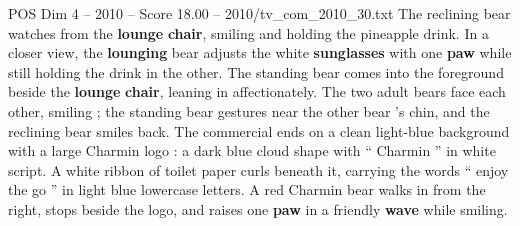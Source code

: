 \begin{textsample}{POS Dim 4 – 2010 – Score 18.00 – 2010/tv\_com\_2010\_30.txt}
The reclining bear watches from the \textbf{lounge} \textbf{chair}, smiling and holding the pineapple drink.
In a closer view, the \textbf{lounging} bear adjusts the white \textbf{sunglasses} with one \textbf{paw} while still holding the drink in the other.
The standing bear comes into the foreground beside the \textbf{lounge} \textbf{chair}, leaning in affectionately.
The two adult bears face each other, smiling ; the standing bear gestures near the other bear ’s chin, and the reclining bear smiles back.
The commercial ends on a clean light-blue background with a large Charmin logo : a dark blue cloud shape with “ Charmin ” in white script.
A white ribbon of toilet paper curls beneath it, carrying the words “ enjoy the go ” in light blue lowercase letters.
A red Charmin bear walks in from the right, stops beside the logo, and raises one \textbf{paw} in a friendly \textbf{wave} while smiling.

\end{textsample}
